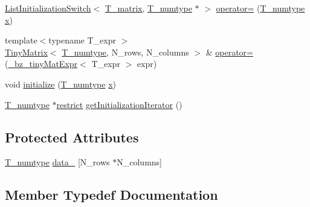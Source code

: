\begin{DoxyCompactItemize}
\item 
\hyperlink{classListInitializationSwitch}{List\+Initialization\+Switch}$<$ \hyperlink{classTinyMatrix_a5ecab8dfaf533005997a64497f41cf5a}{T\+\_\+matrix}, \hyperlink{classTinyMatrix_ae4f83dd6be68ad496c360c01813ff356}{T\+\_\+numtype} $\ast$ $>$ \hyperlink{classTinyMatrix_a320c86dc13316f6b7aedc5dfe147d453}{operator=} (\hyperlink{classTinyMatrix_ae4f83dd6be68ad496c360c01813ff356}{T\+\_\+numtype} \hyperlink{vecnorm1_8cc_ac73eed9e41ec09d58f112f06c2d6cb63}{x})
\item 
{\footnotesize template$<$typename T\+\_\+expr $>$ }\\\hyperlink{classTinyMatrix}{Tiny\+Matrix}$<$ \hyperlink{classTinyMatrix_ae4f83dd6be68ad496c360c01813ff356}{T\+\_\+numtype}, N\+\_\+rows, N\+\_\+columns $>$ \& \hyperlink{classTinyMatrix_a8a5ce3cb2606292b8bd107ea9ba892ba}{operator=} (\hyperlink{class__bz__tinyMatExpr}{\+\_\+bz\+\_\+tiny\+Mat\+Expr}$<$ T\+\_\+expr $>$ expr)
\item 
void \hyperlink{classTinyMatrix_a3173af7c62ea591b7d3a5a272d960abd}{initialize} (\hyperlink{classTinyMatrix_ae4f83dd6be68ad496c360c01813ff356}{T\+\_\+numtype} \hyperlink{vecnorm1_8cc_ac73eed9e41ec09d58f112f06c2d6cb63}{x})
\item 
\hyperlink{classTinyMatrix_ae4f83dd6be68ad496c360c01813ff356}{T\+\_\+numtype} $\ast$\hyperlink{compiler_8h_a080abdcb9c02438f1cd2bb707af25af8}{restrict} \hyperlink{classTinyMatrix_ab0a20c9f05465770c7c59588a416c85e}{get\+Initialization\+Iterator} ()
\end{DoxyCompactItemize}
\subsection*{Protected Attributes}
\begin{DoxyCompactItemize}
\item 
\hyperlink{classTinyMatrix_ae4f83dd6be68ad496c360c01813ff356}{T\+\_\+numtype} \hyperlink{classTinyMatrix_a795148157a5e7a094df5b8177717bee3}{data\+\_\+} \mbox{[}N\+\_\+rows $\ast$N\+\_\+columns\mbox{]}
\end{DoxyCompactItemize}


\subsection{Member Typedef Documentation}
\hypertarget{classTinyMatrix_a5ecab8dfaf533005997a64497f41cf5a}{}
